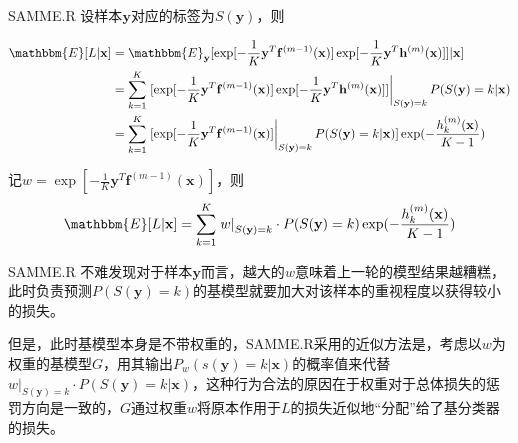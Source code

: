 \documentclass{ctexbeamer}        %
\begin{document}
\begin{frame}{SAMME.R}
设样本$\mathbf{y}$对应的标签为$S(\mathbf{y})$，则
\begin{footnotesize}
\begin{align*}
\mathbbm{E} [L\vert \mathbf{x}] &= \mathbbm{E}_{\mathbf{y}}[ \exp[-\frac{1}{K}\mathbf{y}^T\mathbf{f}^{(m-1)}(\mathbf{x})]
\exp[-\frac{1}{K}\mathbf{y}^T\mathbf{h}^{(m)}(\mathbf{x})]]\vert \mathbf{x}]\\
&=\sum_{k=1}^K\left. [\exp[-\frac{1}{K}\mathbf{y}^T\mathbf{f}^{(m-1)}(\mathbf{x})]\exp[-\frac{1}{K}\mathbf{y}^T\mathbf{h}^{(m)}(\mathbf{x})]]\right|_{S(\mathbf{y})=k}P(S(\mathbf{y})=k\vert \mathbf{x})\\
&=\sum_{k=1}^K \left.[\exp[-\frac{1}{K}\mathbf{y}^T\mathbf{f}^{(m-1)}(\mathbf{x})]\right|_{S(\mathbf{y})=k}P(S(\mathbf{y})=k\vert \mathbf{x})]\exp(-\frac{h^{(m)}_k(\mathbf{x})}{K-1})
\end{align*}
\end{footnotesize}
记$w=\exp[-\frac{1}{K}\mathbf{y}^T\mathbf{f}^{(m-1)}(\mathbf{x})]$，则
$$
\mathbbm{E} [L\vert \mathbf{x}] = \sum_{k=1}^K \left.w\right|_{S(\mathbf{y})=k}\cdot P(S(\mathbf{y})=k)\exp(-\frac{h^{(m)}_k(\mathbf{x})}{K-1})
$$

\end{frame}
\begin{frame}{SAMME.R}
不难发现对于样本$\mathbf{y}$而言，越大的$w$意味着上一轮的模型结果越糟糕，此时负责预测$P(S(\mathbf{y})=k)$的基模型就要加大对该样本的重视程度以获得较小的损失。
\newline

但是，此时基模型本身是不带权重的，SAMME.R采用的近似方法是，考虑以$w$为权重的基模型$G$，用其输出$P_w(s(\mathbf{y})=k\vert \mathbf{x})$的概率值来代替$\left.w\right|_{S(\mathbf{y})=k}\cdot P(S(\mathbf{y})=k\vert \mathbf{x})$，这种行为合法的原因在于权重对于总体损失的惩罚方向是一致的，$G$通过权重$w$将原本作用于$L$的损失近似地“分配”给了基分类器的损失。
\end{frame}
\end{document}

